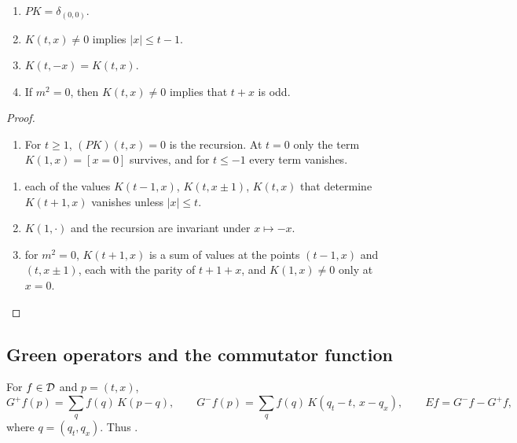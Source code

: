 \begin{lemma}\label{lem:kernel}
\begin{enumerate}[label=(\alph*),leftmargin=2.5em]
\item $PK=\delta_{(0,0)}$.
\item $K(t,x)\neq0$ implies $|x|\leq t-1$.
\item $K(t,-x)=K(t,x)$.
\item If $m^2=0$, then $K(t,x)\neq0$ implies that $t+x$ is odd.
\end{enumerate}
\end{lemma}
\begin{proof}
\begin{enumerate}[leftmargin=2.5em]
\item[(a)] For $t\geq1$, $(PK)(t,x)=0$ is the recursion. At $t=0$ only the term
$K(1,x)=[x=0]$ survives, and for $t\leq-1$ every term vanishes.
\end{enumerate}
\begin{enumerate}[leftmargin=2.5em]
\item[(b)] each of the values $K(t-1,x)$, $K(t,x\pm1)$, $K(t,x)$ that
determine $K(t+1,x)$ vanishes unless $|x|\leq t$.
\item[(c)] $K(1,\cdot)$ and the recursion are invariant under
$x\mapsto-x$.
\item[(d)] for $m^2=0$, $K(t+1,x)$ is a sum of values at the points
$(t-1,x)$ and $(t,x\pm1)$, each with the parity of $t+1+x$, and $K(1,x)\neq0$ only at $x=0$.
\end{enumerate}
\end{proof}

\noindent{}

\subsection{Green operators and the commutator function}

\begin{definition}\label{def:green}
For $f\in\mathcal D$ and $p=(t,x)$,
\[
G^+f(p)=\sum_qf(q)\,K(p-q),\qquad G^-f(p)=\sum_qf(q)\,K(q_t-t,\,x-q_x),\qquad
Ef=G^-f-G^+f,
\]
where $q=(q_t,q_x)$. Thus .
\end{definition}

